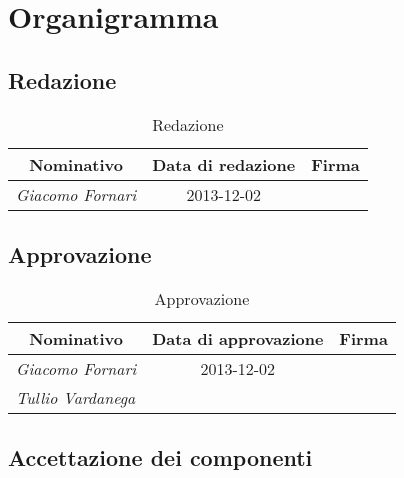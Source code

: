 \section{Organigramma}

	\subsection{Redazione}
	
	\def\arraystretch{2}
	\begin{table}[h]
	\centering
	\begin{tabular}{ l c l }
	\hline
	\multicolumn{1}{c}{\textbf{Nominativo}} & \multicolumn{1}{c}{\textbf{Data di redazione}} & \multicolumn{1}{c}{\textbf{Firma}} \\
	\hline
	\textit{Giacomo Fornari} & 2013-12-02 & \hspace{5cm} \\
	\hline
	\end{tabular}
	\caption{Redazione}
	\end{table}
		
	\subsection{Approvazione}
	
	\begin{table}[h]
	\centering
	\begin{tabular}{ l c l }
	\hline
	\multicolumn{1}{c}{\textbf{Nominativo}} & \multicolumn{1}{c}{\textbf{Data di approvazione}} & \multicolumn{1}{c}{\textbf{Firma}} \\
	\hline
	\textit{Giacomo Fornari} & 2013-12-02 & \hspace{5cm} \\
	\textit{Tullio Vardanega} &  & \hspace{5cm} \\
	\hline
	\end{tabular}
	\caption{Approvazione}
	\end{table}
	
	\subsection{Accettazione dei componenti}
	
